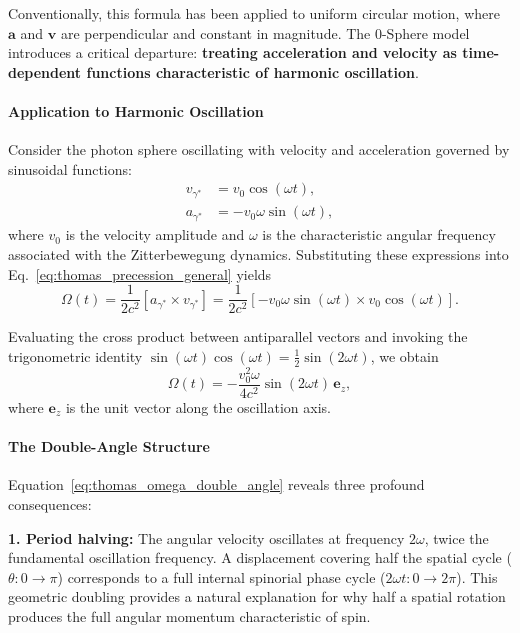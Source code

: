 \documentclass[12pt,letterpaper]{article}
\begin{document}
Conventionally, this formula has been applied to uniform circular motion, where $\bm{a}$ and $\bm{v}$ are perpendicular and constant in magnitude. The 0-Sphere model introduces a critical departure: \textbf{treating acceleration and velocity as time-dependent functions characteristic of harmonic oscillation}.

\paragraph{Application to Harmonic Oscillation}

Consider the photon sphere oscillating with velocity and acceleration governed by sinusoidal functions:
\begin{align}
v_{\gamma^*} &= v_0 \cos(\omega t), \label{eq:velocity_harmonic} \\
a_{\gamma^*} &= -v_0 \omega \sin(\omega t), \label{eq:acceleration_harmonic}
\end{align}
where $v_0$ is the velocity amplitude and $\omega$ is the characteristic angular frequency associated with the Zitterbewegung dynamics. Substituting these expressions into Eq.~\eqref{eq:thomas_precession_general} yields
\begin{equation}
\Omega(t) = \frac{1}{2c^2} [a_{\gamma^*} \times v_{\gamma^*}] = \frac{1}{2c^2} \left[ -v_0 \omega \sin(\omega t) \times v_0 \cos(\omega t) \right].
\end{equation}

Evaluating the cross product between antiparallel vectors and invoking the trigonometric identity $\sin(\omega t) \cos(\omega t) = \frac{1}{2}\sin(2\omega t)$, we obtain
\begin{equation}
\Omega(t) = -\frac{v_0^2 \omega}{4c^2} \sin(2\omega t) \, \bm{e}_z,
\label{eq:thomas_omega_double_angle}
\end{equation}
where $\bm{e}_z$ is the unit vector along the oscillation axis.

\paragraph{The Double-Angle Structure}

Equation~\eqref{eq:thomas_omega_double_angle} reveals three profound consequences:

\textbf{1. Period halving:} The angular velocity oscillates at frequency $2\omega$, twice the fundamental oscillation frequency. A displacement covering half the spatial cycle ($\theta: 0 \to \pi$) corresponds to a full internal spinorial phase cycle ($2\omega t: 0 \to 2\pi$). This geometric doubling provides a natural explanation for why half a spatial rotation produces the full angular momentum characteristic of spin.
\end{document}
